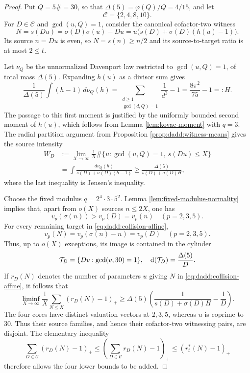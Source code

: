 \documentclass[11pt,letterpaper,reqno]{amsart}
\numberwithin{equation}{section}
\theoremstyle{remark}
\newcommand{\1}{\mathbf 1}
\renewcommand{\leq}{\leqslant}
\renewcommand{\geq}{\geqslant}
\begin{document}
\begin{proof}
Put $Q=5\#=30$, so that $\Delta(5)=\varphi(Q)/Q=4/15$, and let
\[
 \mathcal{C}=\{2,4,8,10\}.
\]
For $D\in\mathcal{C}$ and $\gcd(u,Q)=1$, consider the canonical
cofactor-two witness
\begin{equation}
\label{eq:dadd:collision-affine}
 N=s(Du)=\sigma(D)\sigma(u)-Du
 =u\bigl(s(D)+\sigma(D)(h(u)-1)\bigr).
\end{equation}
Its source $n=Du$ is even, so $N=s(n)\geq n/2$ and its
source-to-target ratio is at most $2\leq t$.

Let $\nu_Q$ be the unnormalized Davenport law restricted to
$\gcd(u,Q)=1$, of total mass $\Delta(5)$. Expanding $h(u)$ as a divisor
sum gives
\[
 \frac1{\Delta(5)}\int(h-1)\,d\nu_Q(h)
 =\sum_{\substack{d\geq1\\\gcd(d,Q)=1}}\frac1{d^2}-1
 =\frac{8\pi^2}{75}-1=:H.
\]
The passage to this first moment is justified by the uniformly bounded
second moment of $h(u)$, which follows from
Lemma \ref{lem:kovac-moment} with $q=3$. The radial
partition argument from Proposition \ref{prop:dadd:witness-means}
gives the source intensity
\begin{align*}
 W_D
 &:=\lim_{X\to\infty}\frac1X
 \#\{u:\gcd(u,Q)=1,\ s(Du)\leq X\}\\
 &=\int\frac{d\nu_Q(h)}{s(D)+\sigma(D)(h-1)}
 \geq\frac{\Delta(5)}{s(D)+\sigma(D)H},
\end{align*}
where the last inequality is Jensen's inequality.

Choose the fixed modulus $q=2^4\cdot3\cdot5^2$.
Lemma \ref{lem:fixed-modulus-normality} implies that, apart
from $o(X)$ sources $n\leq2X$, one has
\[
 v_p(\sigma(n))>v_p(D)=v_p(n)
 \quad(p=2,3,5).
\]
For every remaining target in \eqref{eq:dadd:collision-affine},
\[
 v_p(N)=v_p(\sigma(n)-n)=v_p(D)
 \quad(p=2,3,5).
\]
Thus, up to $o(X)$ exceptions, its image is contained in the
cylinder
\[
 \mathcal{T}_D=\{Dv:\gcd(v,30)=1\},
 \quad \textup{d}(\mathcal{T}_D)=\frac{\Delta(5)}{D}.
\]
If $r_D(N)$ denotes the number of parameters $u$ giving $N$ in
\eqref{eq:dadd:collision-affine}, it follows that
\[
 \liminf_{X\to\infty}\frac1X
 \sum_{N\leq X}(r_D(N)-1)_+
 \geq\Delta(5)\left(
 \frac1{s(D)+\sigma(D)H}-\frac1D\right).
\]
The four cores have distinct valuation vectors at $2,3,5$, whereas
$u$ is coprime to $30$. Thus their source families, and hence their
cofactor-two witnessing pairs, are disjoint. The elementary inequality
\[
 \sum_{D\in\mathcal{C}}(r_D(N)-1)_+
 \leq\left(\sum_{D\in\mathcal{C}}r_D(N)-1\right)_+
 \leq(r_t^*(N)-1)_+
\]
therefore allows the four lower bounds to be added.


\end{proof}
\end{document}
